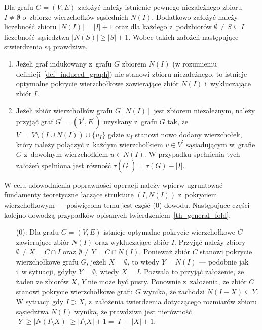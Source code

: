 \par{
  \begin{theorem}
    Dla grafu $G=(V,E)$ założyć należy istnienie pewnego niezależnego zbioru $I\neq \emptyset$ o~zbiorze wierzchołków sąsiednich $N(I)$.
    Dodatkowo założyć należy liczebność zbioru $|N(I)|=|I| + 1$ oraz dla każdego z~podzbiorów $\emptyset \neq S \subseteq I$ liczebność sąsiedztwa $|N(S)| \geq |S| + 1$.
    Wobec takich założeń następujące stwierdzenia są prawdziwe.
    \begin{enumerate}
      \item Jeżeli graf indukowany z~grafu $G$ zbiorem $N(I)$ (w rozumieniu definicji~\ref{def_induced_graph}) nie stanowi zbioru niezależnego, to istnieje optymalne pokrycie wierzchołkowe zawierające zbiór $N(I)$ i~wykluczające zbiór $I$.
      \item Jeżeli zbiór wierzchołków grafu $G[N(I)]$ jest zbiorem niezależnym, należy przyjąć graf $G^\prime=(V^\prime, E^\prime)$ uzyskany z~grafu $G$ tak, że $V^\prime=V \setminus (I \cup N(I)) \cup \{u_I\}$ gdzie $u_I$ stanowi nowo dodany wierzchołek, który należy połączyć z~każdym wierzchołkiem $v \in V^\prime$ sąsiadującym w~grafie $G$ z~dowolnym wierzchołkiem $u \in N(I)$.
      W przypadku spełnienia tych założeń spełniona jest równość $\tau(G^\prime)=\tau(G)-|I|$.
    \end{enumerate}
  \end{theorem}
  \begin{bproof} W celu udowodnienia poprawności operacji należy wpierw ugruntować fundamenty teoretyczne łączące strukturę $(I, N(I))$ z~pokryciem wierzchołkowym --- poświęcona temu jest część (0) dowodu.
    Następujące części kolejno dowodzą przypadków opisanych twierdzeniem~\ref{th_general_fold}.
    \begin{itemize}
      \item[(0):] Dla grafu $G=(V, E)$ istnieje optymalne pokrycie wierzchołkowe $C$ zawierające zbiór $N(I)$ oraz wykluczające zbiór $I$.
      Przyjąć należy zbiory $\emptyset \neq X=C \cap I$ oraz $\emptyset \neq Y=C \cap N(I)$.
      Ponieważ zbiór $C$ stanowi pokrycie wierzchołkowe grafu $G$, jeżeli $X=\emptyset$, to wtedy $Y=N(I)$ --- podobnie jak i~w sytuacji, gdyby $Y=\emptyset$, wtedy $X=I$.
      Pozwala to przyjąć założenie, że żaden ze zbiorów $X$, $Y$ nie może być pusty.
      Ponownie z~założenia, że zbiór $C$ stanowi pokrycie wierzchołkowe grafu $G$ wynika, że zachodzi $N(I-X)\subseteq Y$.
      W sytuacji gdy $I \supset X$, z~założenia twierdzenia dotyczącego rozmiarów zbioru sąsiedztwa $N(I)$ wynika, że prawdziwa jest nierówność $|Y| \geq |N(I \setminus X)| \geq |I \setminus X| + 1 = |I| - |X| + 1$.

\end{itemize}
\end{bproof}}
